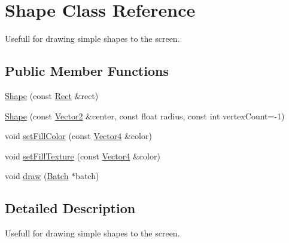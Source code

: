 \hypertarget{class_shape}{\section{Shape Class Reference}
\label{class_shape}
}


Usefull for drawing simple shapes to the screen.  


\subsection*{Public Member Functions}
\begin{DoxyCompactItemize}
\item 
\hyperlink{class_shape_ad04db52be7400a6c82444155b51c5d08}{Shape} (const \hyperlink{class_rect}{Rect} \&rect)
\item 
\hyperlink{class_shape_a8e6b9cf8e35ffa7ed8f4083581896feb}{Shape} (const \hyperlink{class_vector2}{Vector2} \&center, const float radius, const int vertex\+Count=-\/1)
\item 
void \hyperlink{class_shape_a7323c280ccdc95ffc6b9a6baa76868ec}{set\+Fill\+Color} (const \hyperlink{class_vector4}{Vector4} \&color)
\item 
void \hyperlink{class_shape_a7212b234a4702bdee142a81c12dcc312}{set\+Fill\+Texture} (const \hyperlink{class_vector4}{Vector4} \&color)
\item 
void \hyperlink{class_shape_a10c159047a1f624f6ccda7a8341e9a1d}{draw} (\hyperlink{class_batch}{Batch} $\ast$batch)
\end{DoxyCompactItemize}


\subsection{Detailed Description}
Usefull for drawing simple shapes to the screen. 

